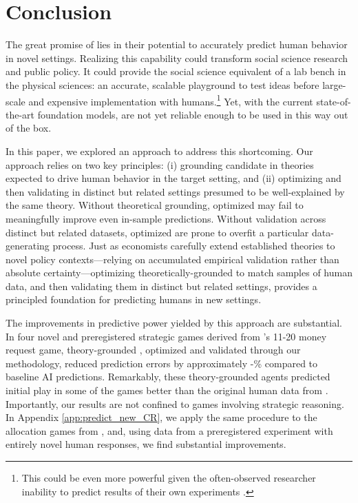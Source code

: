 \section{Conclusion}
\label{sec:conclusion}

The great promise of  lies in their potential to accurately predict human behavior in novel settings.
Realizing this capability could transform social science research and public policy.
It could provide the social science equivalent of a lab bench in the physical sciences: an accurate, scalable playground to test ideas before large-scale and expensive implementation with humans.\footnote{This could be even more powerful given the often-observed researcher inability to predict results of their own experiments \citep{predictscience2019DellaVigna,milkmanMegastudies2021,Gandhi2023Hypothetical,Gandhi2024EffectSize,Duckworth2025ZearnMega}.}
Yet, with the current state-of-the-art foundation models,  are not yet reliable enough to be used in this way out of the box.

In this paper, we explored an approach to address this shortcoming.
Our approach relies on two key principles: (i) grounding candidate  in theories expected to drive human behavior in the target setting, and (ii) optimizing and then validating  in distinct but related settings presumed to be well-explained by the same theory.
Without theoretical grounding, optimized  may fail to meaningfully improve even in-sample predictions.
Without validation across distinct but related datasets, optimized  are prone to overfit a particular data-generating process.
Just as economists carefully extend established theories to novel policy contexts---relying on accumulated empirical validation rather than absolute certainty---optimizing theoretically-grounded  to match samples of human data, and then validating them in distinct but related settings, provides a principled foundation for predicting humans in new settings.

The improvements in predictive power yielded by this approach are substantial. 
In four novel and preregistered strategic games derived from \citeauthor{1120Arad2012}'s 11-20 money request game, theory-grounded , optimized and validated through our methodology, reduced prediction errors by approximately \MinPercImproveArad-\MaxPercImproveArad\% compared to baseline AI predictions. 
Remarkably, these theory-grounded agents predicted initial play in some of the games better than the original human data from \citeauthor{1120Arad2012}. 
Importantly, our results are not confined to games involving strategic reasoning.
In Appendix \ref{app:predict_new_CR}, we apply the same procedure to the allocation games from \citeauthor{charness2002understanding}, and, using data from a preregistered experiment with entirely novel human responses, we find substantial improvements.

